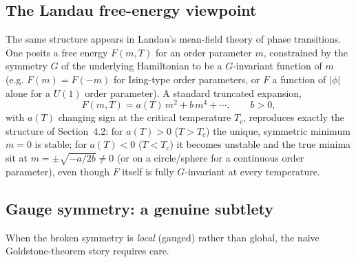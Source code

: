 \documentclass[11pt]{article}
\theoremstyle{definition}
\theoremstyle{remark}
\begin{document}
\subsection{The Landau free-energy viewpoint}

The same structure appears in Landau's mean-field theory of phase transitions. One posits a free energy $F(m,T)$ for an order parameter $m$, constrained by the symmetry $G$ of the underlying Hamiltonian to be a $G$-invariant function of $m$ (e.g. $F(m)=F(-m)$ for Ising-type order parameters, or $F$ a function of $|\phi|$ alone for a $U(1)$ order parameter). A standard truncated expansion,
\[
F(m,T) = a(T)\,m^2 + b\,m^4 + \cdots, \qquad b>0,
\]
with $a(T)$ changing sign at the critical temperature $T_c$, reproduces exactly the structure of Section~4.2: for $a(T)>0$ ($T>T_c$) the unique, symmetric minimum $m=0$ is stable; for $a(T)<0$ ($T<T_c$) it becomes unstable and the true minima sit at $m=\pm\sqrt{-a/2b}\neq0$ (or on a circle/sphere for a continuous order parameter), even though $F$ itself is fully $G$-invariant at every temperature.

\subsection{Gauge symmetry: a genuine subtlety}

When the broken symmetry is \emph{local} (gauged) rather than global, the naive Goldstone-theorem story requires care.
\end{document}
